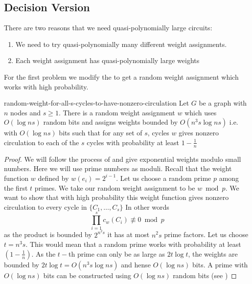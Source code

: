 \subsection{Decision Version}\label{rnc-few-random-decision}
There are two reasons that we need quasi-polynomially large circuits:\begin{enumerate}[label=(\roman*)]
	\item We need to try quasi-polynomially many different weight assignments.
	\item Each weight assignment has quasi-polynomially large weights
\end{enumerate}
For the first problem we modify the  to get a random weight assignment which works with high probability.

\begin{lemma}{\cite{ChariRohatgiSrinivasan_1993_Rou_CONF, KlivansSpielman_2001_Rei_CONF}}{random-weight-for-all-s-cycles-to-have-nonzero-circulation}
	Let $G$ be a graph with $n$ nodes and $s\geq 1$. There is a random weight assignment $w$ which uses $O(\log ns)$ random bits and assigns weights bounded by $O(n^3s\log ns)$ i.e. with $O(\log ns)$ bits such that for any set of $s$, cycles $w$ gives nonzero circulation to each of the $s$ cycles with probability at least $1-\frac{1}{n}$
\end{lemma}
\begin{proof}
	We will follow the process of  and give exponential weights modulo small numbers. Here we will use prime numbers as moduli. Recall that the weight function $w$ defined by $w(e_i)=2^{i-1}$. Let us choose a random prime $p$ among the first $t$ primes. We take our random weight assignment to be $w\bmod p$. We want to show that with high probability this weight function gives nonzero circulation to every cycle in $\{C_1,\dots, C_s\}$ In other words \[
		\prod\limits_{i=1}^{s} c_w(C_i)\not\equiv 0\bmod p
	\]
	as the product is bounded by $2^{n^2s}$ it has at most $n^2s$ prime factors. Let us choose $t=n^3s$. This would mean that a random prime works with probability at least $\left(1-\frac1n\right)$. As the $t-$th prime can only be as large as $2t\log t$, the weights are bounded by $2t\log t=O(n^3s\log ns)$ and hense $O(\log ns)$ bits. A prime with $O(\log ns)$ bits can be constructed using $O(\log ns)$ random bits (see \cite{KlivansSpielman_2001_Rei_CONF})
\end{proof}

